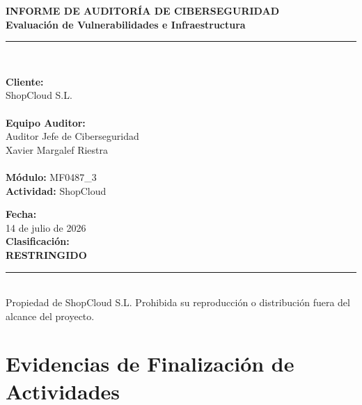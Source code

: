 \documentclass[11pt,a4paper]{report}
\begin{document}
\begin{titlepage}
    \centering
    \vspace*{1.5cm}
    {\LARGE\bfseries\color{darkblue} INFORME DE AUDITORÍA DE CIBERSEGURIDAD}\\[0.4cm]
    {\large\bfseries\color{secblue} Evaluación de Vulnerabilidades e Infraestructura}\\[2.5cm]
    
    \noindent\rule{\textwidth}{1pt}\\[1.5cm]
    
    \begin{minipage}{0.6\textwidth}
        \large
        \textbf{Cliente:} \\
        ShopCloud S.L. \\\\
        \textbf{Equipo Auditor:} \\
        Auditor Jefe de Ciberseguridad \\
        Xavier Margalef Riestra \\\\
        \textbf{Módulo:} MF0487\_3 \\
        \textbf{Actividad:} ShopCloud \\
    \end{minipage}
    \begin{minipage}{0.39\textwidth}
        \flushright
        \large
        \textbf{Fecha:} \\
        14 de julio de 2026 \\[1cm]
        \textbf{Clasificación:} \\
        \textbf{RESTRINGIDO}
    \end{minipage}
    
    \vfill
    \noindent\rule{\textwidth}{1pt}\\[0.5cm]
    {\small Propiedad de ShopCloud S.L. Prohibida su reproducción o distribución fuera del alcance del proyecto.}
\end{titlepage}

\chapter*{Evidencias de Finalización de Actividades}
\end{document}
